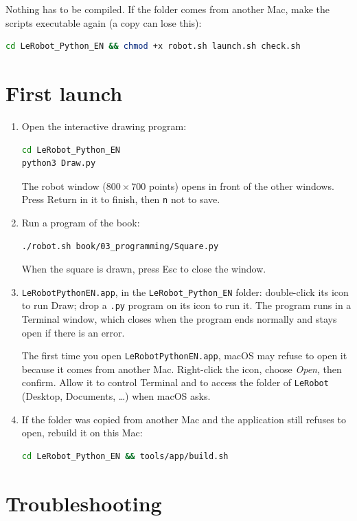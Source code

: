 \documentclass[11pt,a4paper]{article}
\newcommand{\kbd}[1]{\texttt{#1}}
\begin{document}
Nothing has to be compiled. If the folder comes from another Mac, make the
scripts executable again (a copy can lose this):
\begin{lstlisting}[language=bash]
cd LeRobot_Python_EN && chmod +x robot.sh launch.sh check.sh
\end{lstlisting}

\section{First launch}

\begin{enumerate}
\item Open the interactive drawing program:
\begin{lstlisting}[language=bash]
cd LeRobot_Python_EN
python3 Draw.py
\end{lstlisting}
  The robot window ($800 \times 700$ points) opens in front of the other
  windows. Press Return in it to finish, then \kbd{n} not to save.
\item Run a program of the book:
\begin{lstlisting}[language=bash]
./robot.sh book/03_programming/Square.py
\end{lstlisting}
  When the square is drawn, press Esc to close the window.
\item \kbd{LeRobotPythonEN.app}, in the \kbd{LeRobot\_Python\_EN} folder:
  double-click its icon to run Draw; drop a \kbd{.py} program on its
  icon to run it. The program runs in a Terminal window, which closes when
  the program ends normally and stays open if there is an error.

  The first time you open \kbd{LeRobotPythonEN.app}, macOS may refuse to open
  it because it comes from another Mac. Right-click the icon, choose
  \emph{Open}, then confirm. Allow it to control Terminal and to access the
  folder of \kbd{LeRobot} (Desktop, Documents, \dots) when macOS asks.
\item If the folder was copied from another Mac and the application still
  refuses to open, rebuild it on this Mac:
\begin{lstlisting}[language=bash]
cd LeRobot_Python_EN && tools/app/build.sh
\end{lstlisting}
\end{enumerate}

\section{Troubleshooting}
\end{document}
